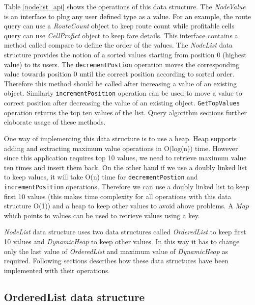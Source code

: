 Table \ref{nodelist_api} shows the operations of this data structure. The \textit{NodeValue} is an interface to plug any user defined type as a value. For an example, the route query can use a \textit{RouteCount} object to keep route count while profitable cells query can use \textit{CellProfict} object to keep fare details. This interface contains a method called compare to define the order of the values. The \textit{NodeList} data structure provides the notion of a sorted values starting from position 0 (highest value) to its users. The \texttt{decrementPostion} operation moves the corresponding value towards position 0 until the correct position according to sorted order. Therefore this method should be called after increasing a value of an existing object. Similarly \texttt{incrementPosition} operation can be used to move a value to correct position after decreasing the value of an existing object. \texttt{GetTopValues} operation returns the top ten values of the list. Query algorithm sections further elaborate usage of these methods.

One way of implementing this data structure is to use a heap. Heap supports adding and extracting maximum value operations in O(log(n)) time. However since this application requires top 10 values, we need to retrieve maximum value ten times and insert them back. On the other hand if we use a doubly linked list to keep values, it will take O(n) time for  \texttt{decrementPostion} and \texttt{incrementPosition} operations. Therefore we can use a doubly linked list to keep first 10 values (this makes time complexity for all operations with this data structure O(1)) and a heap to keep other values to avoid above problems.  A \textit{Map} which points to values can be used to retrieve values using a key.

\textit{NodeList} data structure uses two data structures called \textit{OrderedList} to keep first 10 values and \textit{DynamicHeap} to keep other values. In this way it has to change only the last value of \textit{OrderedList} and maximum value of \textit{DynamicHeap} as required. Following sections describes how these data structures have been implemented with their operations.

\subsection{OrderedList data structure}

